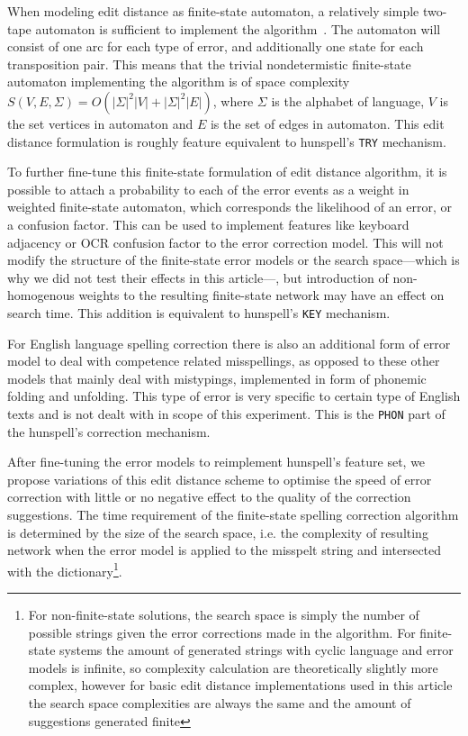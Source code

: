 \documentclass[11pt]{article}
\begin{document}
When modeling edit distance as finite-state automaton, a relatively simple
two-tape automaton is sufficient to implement the algorithm~\cite{hassan/2008}.
The automaton will consist of one arc for each type of error, and additionally
one state for each transposition pair. This means that the trivial
nondetermistic finite-state automaton implementing the algorithm is of space
complexity $S(V, E, \Sigma) = O(|\Sigma|^2 |V| + |\Sigma|^2 |E|)$, where
$\Sigma$ is the alphabet of language, $V$ is the set vertices in automaton and
$E$ is the set of edges in automaton.  This edit distance formulation is
roughly feature equivalent to hunspell's \texttt{TRY} mechanism.

To further fine-tune this finite-state formulation of edit distance algorithm,
it is possible to attach a probability to each of the error events as a weight
in weighted finite-state automaton, which corresponds the likelihood of an
error, or a confusion factor. This can be used to implement features like
keyboard adjacency or OCR confusion factor to the error correction model. This
will not modify the structure of the finite-state error models or the search
space---which is why we did not test their effects in this article---, but introduction of
non-homogenous weights to the resulting finite-state network may have an effect on
search time. This addition is equivalent to hunspell's \texttt{KEY} mechanism.

For English language spelling correction there is also an additional form of
error model to deal with competence related misspellings, as opposed to these
other models that mainly deal with mistypings, implemented in form of phonemic
folding and unfolding. This type of error is very specific to certain type of
English texts and is not dealt with in scope of this experiment. This is
the \texttt{PHON} part of the hunspell's correction mechanism.

After fine-tuning the error models to reimplement hunspell's feature set, we
propose variations of this edit distance scheme to optimise the
speed of error correction with little or no negative effect to the quality of
the correction suggestions. The time requirement of the
finite-state spelling correction algorithm is determined by the size of the
search space,
i.e. the complexity of resulting network when the error model is applied to the
misspelt string and intersected with the dictionary\footnote{For non-finite-state
solutions, the search space is simply the number of
possible strings given the error corrections made in the algorithm. For
finite-state systems the amount of generated strings with cyclic language and
error models is infinite, so complexity calculation are theoretically slightly
more complex, however for basic edit distance implementations used in this
article the search space complexities are always the same and the amount of
suggestions generated finite}.
\end{document}
